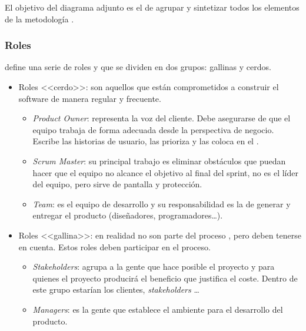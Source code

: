 El objetivo del diagrama adjunto   es el de agrupar y sintetizar todos los elementos de la metodología \scrum{}.


\subsubsection*{Roles}
\scrum{}  define una serie de roles y que se dividen en dos grupos: gallinas y cerdos.
\begin{itemize}
 \item Roles <<cerdo>>: son aquellos que están comprometidos a construir el software de manera regular y frecuente.
  \begin{itemize}
   \item \textit{Product Owner}: representa la voz del cliente. Debe asegurarse de que el equipo trabaja de forma adecuada desde la perspectiva de negocio. Escribe las historias de usuario, las prioriza y las coloca en el \productbacklog{}.
   \item \textit{Scrum Master}: su principal trabajo es eliminar obstáculos que puedan hacer que el equipo no alcance el objetivo al final del sprint, no es el líder del equipo, pero sirve de pantalla y protección.
   \item \textit{Team}: es el equipo de desarrollo y su responsabilidad es la de generar y entregar el producto (diseñadores, programadores\dots).
  \end{itemize}
 \item Roles <<gallina>>: en realidad no son parte del proceso \scrum{}, pero deben tenerse en cuenta. Estos roles deben participar en el proceso.
  \begin{itemize}
   \item \textit{Stakeholders}: agrupa a la gente que hace posible el proyecto y para quienes el proyecto producirá el beneficio que justifica el coste. Dentro de este grupo estarían los clientes, \textit{stakeholders} \dots
   \item \textit{Managers}: es la gente que establece el ambiente para el desarrollo del producto.
  \end{itemize}
\end{itemize}

